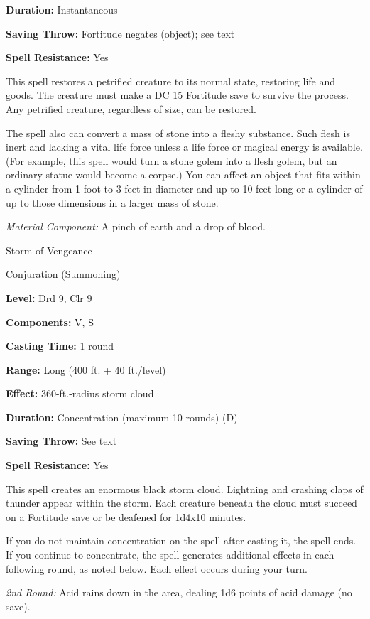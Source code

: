 \documentclass{article}
\begin{document}
\textbf{Duration:} Instantaneous

\textbf{Saving Throw:} Fortitude negates (object); see text

\textbf{Spell Resistance:} Yes

This spell restores a petrified creature to its normal state, restoring life and 
goods. The creature must make a DC 15 Fortitude save to survive the process. Any 
petrified creature, regardless of size, can be restored.

The spell also can convert a mass of stone into a fleshy substance. Such flesh 
is inert and lacking a vital life force unless a life force or magical energy is 
available. (For example, this spell would turn a stone golem into a flesh golem, 
but an ordinary statue would become a corpse.) You can affect an object that fits 
within a cylinder from 1 foot to 3 feet in diameter and up to 10 feet long or a 
cylinder of up to those dimensions in a larger mass of stone.

\textit{Material Component: }A pinch of earth and a drop of blood.

\vspace{12pt}
Storm of Vengeance

Conjuration (Summoning)

\textbf{Level:} Drd 9, Clr 9

\textbf{Components:} V, S

\textbf{Casting Time:} 1 round

\textbf{Range:} Long (400 ft. + 40 ft./level)

\textbf{Effect:} 360-ft.-radius storm cloud

\textbf{Duration:} Concentration (maximum 10 rounds) (D)

\textbf{Saving Throw:} See text

\textbf{Spell Resistance:} Yes

This spell creates an enormous black storm cloud. Lightning and crashing claps 
of thunder appear within the storm. Each creature beneath the cloud must succeed 
on a Fortitude save or be deafened for 1d4x10 minutes.

If you do not maintain concentration on the spell after casting it, the spell ends. 
 If you continue to concentrate, the spell generates additional effects in each 
following round, as noted below. Each effect occurs during your turn.

\textit{2nd Round: }Acid rains down in the area, dealing 1d6 points of acid damage 
(no save).
\end{document}
